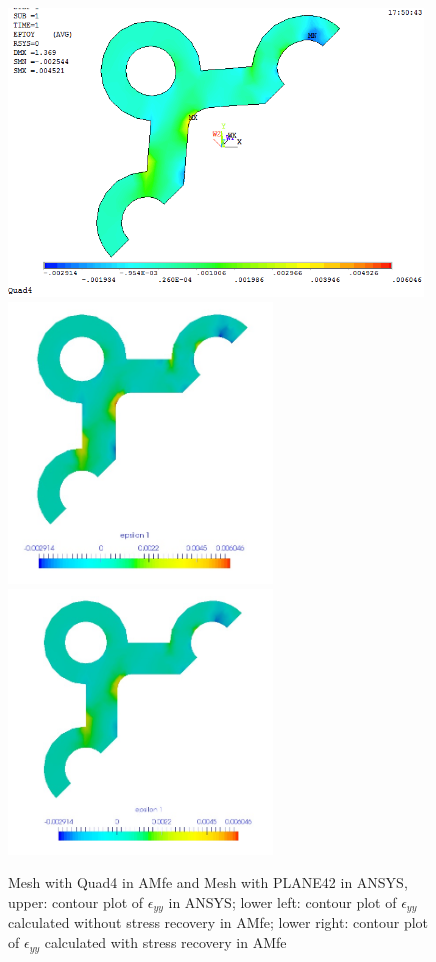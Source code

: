 \begin{figure}[htbp]
	\begin{center}
		\includegraphics[width=11cm,clip]{Quad4_Eyy.png} 	
		\includegraphics[width=7cm,clip]{Quad4_Eyy_PD.png} 		
		\includegraphics[width=7cm,clip]{Quad4_Eyy_P.png} 		
		\caption{Mesh with Quad4 in AMfe and Mesh with PLANE42 in ANSYS, upper: contour plot of $\epsilon_{yy}$ in ANSYS; lower left: contour plot of $\epsilon_{yy}$ calculated without stress recovery in AMfe; lower right: contour plot of $\epsilon_{yy}$ calculated with stress recovery in AMfe} \label{fig: Quad4_Eyy}
	\end{center}
\end{figure}
\clearpage 

